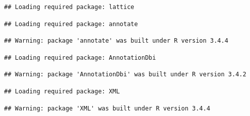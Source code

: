 \documentclass[]{article}
\newenvironment{Shaded}{\begin{snugshade}}{\end{snugshade}}
\newcommand{\KeywordTok}[1]{\textcolor[rgb]{0.13,0.29,0.53}{\textbf{{#1}}}}
\newcommand{\DataTypeTok}[1]{\textcolor[rgb]{0.13,0.29,0.53}{{#1}}}
\newcommand{\DecValTok}[1]{\textcolor[rgb]{0.00,0.00,0.81}{{#1}}}
\newcommand{\StringTok}[1]{\textcolor[rgb]{0.31,0.60,0.02}{{#1}}}
\newcommand{\OtherTok}[1]{\textcolor[rgb]{0.56,0.35,0.01}{{#1}}}
\newcommand{\NormalTok}[1]{{#1}}
\begin{document}
\begin{verbatim}
## Loading required package: lattice
\end{verbatim}

\begin{verbatim}
## Loading required package: annotate
\end{verbatim}

\begin{verbatim}
## Warning: package 'annotate' was built under R version 3.4.4
\end{verbatim}

\begin{verbatim}
## Loading required package: AnnotationDbi
\end{verbatim}

\begin{verbatim}
## Warning: package 'AnnotationDbi' was built under R version 3.4.2
\end{verbatim}

\begin{verbatim}
## Loading required package: XML
\end{verbatim}

\begin{verbatim}
## Warning: package 'XML' was built under R version 3.4.4
\end{verbatim}

\begin{Shaded}
\end{Shaded}
\end{document}
